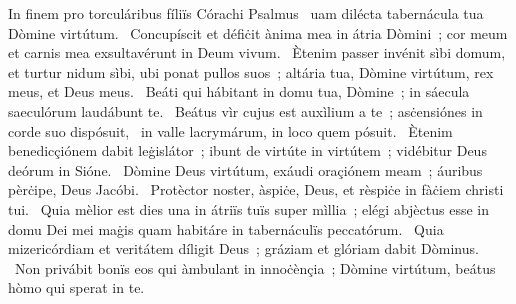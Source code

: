 { In finem pro torculáribus fíliïs Córachi Psalmus}
{%
~uam dilécta tabernácula tua Dòmine virtútum. 
~Concupíscit et défiċit ànima mea in átria Dòmini~; cor meum et carnis mea exsultavérunt in Deum vivum. 
~Ètenim passer invénit sìbi domum, et turtur nidum sìbi, ubi ponat pullos suos~; altária tua, Dòmine virtútum, rex meus, et Deus meus. 
~Beáti qui hábitant in domu tua, Dòmine~; in sáecula saeculórum laudábunt te. 
~Beátus vìr cujus est auxìlium a te~; asċensiónes in corde suo dispósuit, 
~in valle lacrymárum, in loco quem pósuit. 
~Ètenim benedicçiónem dabit leġislátor~; ibunt de virtúte in virtútem~; vidébitur Deus deórum in Sióne. 
~Dòmine Deus virtútum, exáudi oraçiónem meam~; áuribus pèrċipe, Deus Jacóbi. 
~Protèctor noster, àspiċe, Deus, et rèspiċe in fàċiem christi tui. 
~Quia mèlior est dies una in átriïs tuïs super mìllia~; elégi abjèctus esse in domu Dei mei maġis quam habitáre in tabernáculïs peccatórum. 
~Quia mizericórdiam et veritátem díligit Deus~; gráziam et glóriam dabit Dòminus. 
~Non privábit bonïs eos qui àmbulant in innoċènçia~; Dòmine virtútum, beátus hòmo qui sperat in te. 
}
